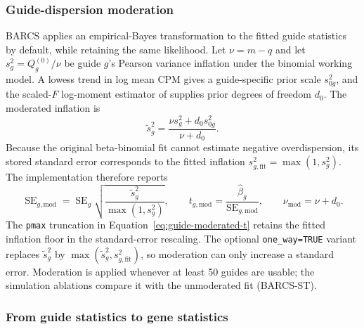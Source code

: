 \subsubsection{Guide-dispersion moderation}

BARCS applies an empirical-Bayes transformation to the fitted guide statistics
by default, while retaining the same likelihood.  Let $\nu=m-q$ and let
$s_g^2=Q_g^{(0)}/\nu$ be guide $g$'s Pearson variance inflation under the
binomial working model.  A lowess trend in log mean CPM gives a guide-specific
prior scale $s_{0g}^2$, and the scaled-$F$ log-moment estimator of
\citet{smyth2004linear} supplies prior degrees of freedom $d_0$.  The moderated
inflation is
\begin{equation}
  \widetilde{s}_g^2
  =
  \frac{\nu s_g^2+d_0s_{0g}^2}{\nu+d_0}.
  \label{eq:guide-moderation}
\end{equation}
Because the original beta-binomial fit cannot estimate negative
overdispersion, its stored standard error corresponds to the fitted inflation
$s_{g,\mathrm{fit}}^2=\max(1,s_g^2)$.  The implementation therefore reports
\begin{equation}
  \operatorname{SE}_{g,\mathrm{mod}}
  =
  \operatorname{SE}_{g}
  \sqrt{\frac{\widetilde{s}_g^2}{\max(1,s_g^2)}},
  \qquad
  t_{g,\mathrm{mod}}
  =
  \frac{\widehat\beta_g}{\operatorname{SE}_{g,\mathrm{mod}}},
  \qquad
  \nu_{\mathrm{mod}}=\nu+d_0 .
  \label{eq:guide-moderated-t}
\end{equation}
The \texttt{pmax} truncation in
Equation~\eqref{eq:guide-moderated-t} retains the fitted inflation floor in
the standard-error rescaling.  The optional \texttt{one\_way=TRUE}
variant replaces $\widetilde{s}_g^2$ by
$\max(\widetilde{s}_g^2,s_{g,\mathrm{fit}}^2)$, so moderation can only increase
a standard error.  Moderation is applied whenever at least 50 guides are
usable; the simulation ablations compare it with the unmoderated fit
(BARCS-ST).

\subsubsection{From guide statistics to gene statistics}

